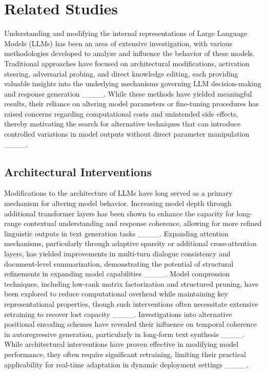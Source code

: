 \section{Related Studies}
Understanding and modifying the internal representations of Large Language Models (LLMs) has been an area of extensive investigation, with various methodologies developed to analyze and influence the behavior of these models. Traditional approaches have focused on architectural modifications, activation steering, adversarial probing, and direct knowledge editing, each providing valuable insights into the underlying mechanisms governing LLM decision-making and response generation ____. While these methods have yielded meaningful results, their reliance on altering model parameters or fine-tuning procedures has raised concerns regarding computational costs and unintended side effects, thereby motivating the search for alternative techniques that can introduce controlled variations in model outputs without direct parameter manipulation ____. 

\subsection{Architectural Interventions}

Modifications to the architecture of LLMs have long served as a primary mechanism for altering model behavior. Increasing model depth through additional transformer layers has been shown to enhance the capacity for long-range contextual understanding and response coherence, allowing for more refined linguistic outputs in text generation tasks ____. Expanding attention mechanisms, particularly through adaptive sparsity or additional cross-attention layers, has yielded improvements in multi-turn dialogue consistency and document-level summarization, demonstrating the potential of structural refinements in expanding model capabilities ____. Model compression techniques, including low-rank matrix factorization and structured pruning, have been explored to reduce computational overhead while maintaining key representational properties, though such interventions often necessitate extensive retraining to recover lost capacity ____. Investigations into alternative positional encoding schemes have revealed their influence on temporal coherence in autoregressive generation, particularly in long-form text synthesis ____. While architectural interventions have proven effective in modifying model performance, they often require significant retraining, limiting their practical applicability for real-time adaptation in dynamic deployment settings ____.

